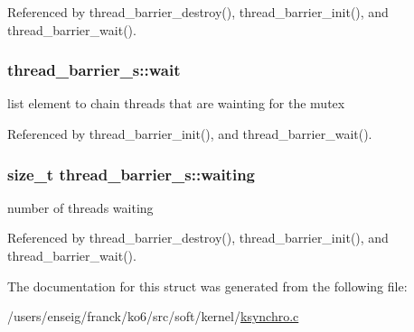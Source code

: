 Referenced by thread\-\_\-barrier\-\_\-destroy(), thread\-\_\-barrier\-\_\-init(), and thread\-\_\-barrier\-\_\-wait().

\hypertarget{structthread__barrier__s_a64884bf0d1a1ef7f4a06521553e2e066}{
\subsubsection[{wait}]{ thread\-\_\-barrier\-\_\-s\-::wait}}\label{structthread__barrier__s_a64884bf0d1a1ef7f4a06521553e2e066}


list element to chain threads that are wainting for the mutex 



Referenced by thread\-\_\-barrier\-\_\-init(), and thread\-\_\-barrier\-\_\-wait().

\hypertarget{structthread__barrier__s_a2d4b05b20a64eb8536021d7a553c1de1}{
\subsubsection[{waiting}]{\setlength{\rightskip}{0pt plus 5cm}size\-\_\-t thread\-\_\-barrier\-\_\-s\-::waiting}}\label{structthread__barrier__s_a2d4b05b20a64eb8536021d7a553c1de1}


number of threads waiting 



Referenced by thread\-\_\-barrier\-\_\-destroy(), thread\-\_\-barrier\-\_\-init(), and thread\-\_\-barrier\-\_\-wait().



The documentation for this struct was generated from the following file\-:\begin{DoxyCompactItemize}
\item 
/users/enseig/franck/ko6/src/soft/kernel/\hyperlink{ksynchro_8c}{ksynchro.\-c}\end{DoxyCompactItemize}
